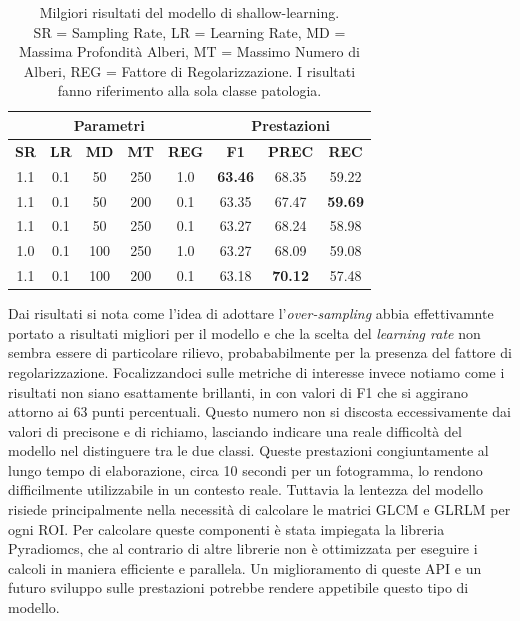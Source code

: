 \begin{table}
    \centering
    \begin{tabular}[h]{||c|c|c|c|c||c|c|c||}
    \hline
    \multicolumn{5}{||c||}{\bf Parametri} & \multicolumn{3}{c||}{\bf Prestazioni} \\
    \hline
    \textbf{SR}  & \textbf{LR}  & \textbf{MD}  & \textbf{MT}  & \textbf{REG} & \textbf{F1} & \textbf{PREC}  & \textbf{REC} \\
    \hline
    \hline
    1.1 & 0.1 & 50  & 250 & 1.0 & {\bf 63.46} & 68.35 & 59.22 \\ 
    1.1 & 0.1 & 50  & 200 & 0.1 & 63.35 & 67.47 & {\bf 59.69} \\ 
    1.1 & 0.1 & 50  & 250 & 0.1 & 63.27 & 68.24 & 58.98 \\ 
    1.0 & 0.1 & 100 & 250 & 1.0 & 63.27 & 68.09 & 59.08 \\ 
    1.1 & 0.1 & 100 & 200 & 0.1 & 63.18 & {\bf 70.12} & 57.48 \\ 
    \hline
    \end{tabular}
    \caption{\label{tab:shallow-learning-results}Milgiori risultati 
    del modello di shallow-learning. \\
    SR = Sampling Rate, LR = Learning Rate, MD = Massima Profondità
    Alberi, MT = Massimo Numero di Alberi, 
    REG = Fattore di Regolarizzazione.
    I risultati fanno riferimento alla sola classe patologia.
    }
\end{table}

Dai risultati si nota come l'idea di adottare
l'{\it over-sampling} abbia effettivamnte
portato a risultati migliori per il modello
e che la scelta del {\it learning rate}
non sembra essere di particolare rilievo,
probababilmente per la presenza del fattore
di regolarizzazione.
Focalizzandoci sulle metriche di interesse
invece notiamo come i risultati non siano
esattamente brillanti, in con valori di 
F1 che si aggirano attorno ai 63
punti percentuali.
Questo numero non si discosta eccessivamente
dai valori di precisone e di richiamo,
lasciando indicare una reale difficoltà
del modello nel distinguere tra le due classi.
Queste prestazioni congiuntamente al lungo
tempo di elaborazione, circa 10 secondi per un
fotogramma, lo rendono difficilmente utilizzabile
in un contesto reale.
Tuttavia la lentezza del modello risiede
principalmente nella necessità di calcolare
le matrici GLCM e GLRLM per ogni ROI.
Per calcolare queste componenti è
stata impiegata la libreria
Pyradiomcs\cite{radiomics}, che al contrario
di altre librerie non è ottimizzata per
eseguire i calcoli in maniera efficiente e 
parallela.
Un miglioramento di queste API e un futuro
sviluppo sulle prestazioni potrebbe
rendere appetibile questo tipo di
modello.

